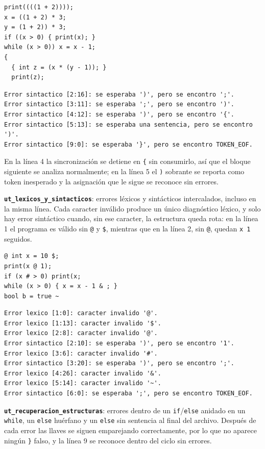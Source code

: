 \documentclass[12pt,letterpaper]{article}
\begin{document}
\begin{verbatim}
print((((1 + 2))));
x = ((1 + 2) * 3;
y = (1 + 2)) * 3;
if ((x > 0) { print(x); }
while (x > 0)) x = x - 1;
{
  { int z = (x * (y - 1)); }
  print(z);
\end{verbatim}

\begin{verbatim}
Error sintactico [2:16]: se esperaba ')', pero se encontro ';'.
Error sintactico [3:11]: se esperaba ';', pero se encontro ')'.
Error sintactico [4:12]: se esperaba ')', pero se encontro '{'.
Error sintactico [5:13]: se esperaba una sentencia, pero se encontro ')'.
Error sintactico [9:0]: se esperaba '}', pero se encontro TOKEN_EOF.
\end{verbatim}

En la línea 4 la sincronización se detiene en \texttt{\{} sin consumirlo, así que el bloque siguiente se
analiza normalmente; en la línea 5 el \texttt{)} sobrante se reporta como token inesperado y la asignación que
le sigue se reconoce sin errores.

\textbf{\texttt{ut\_lexicos\_y\_sintacticos}}: errores léxicos y sintácticos intercalados, incluso en la misma
línea. Cada caracter inválido produce un único diagnóstico léxico, y solo hay error sintáctico cuando, sin ese
caracter, la estructura queda rota: en la línea 1 el programa es válido sin \texttt{@} y \texttt{\$}, mientras
que en la línea 2, sin \texttt{@}, quedan \texttt{x 1} seguidos.

\begin{verbatim}
@ int x = 10 $;
print(x @ 1);
if (x # > 0) print(x;
while (x > 0) { x = x - 1 & ; }
bool b = true ~
\end{verbatim}

\begin{verbatim}
Error lexico [1:0]: caracter invalido '@'.
Error lexico [1:13]: caracter invalido '$'.
Error lexico [2:8]: caracter invalido '@'.
Error sintactico [2:10]: se esperaba ')', pero se encontro '1'.
Error lexico [3:6]: caracter invalido '#'.
Error sintactico [3:20]: se esperaba ')', pero se encontro ';'.
Error lexico [4:26]: caracter invalido '&'.
Error lexico [5:14]: caracter invalido '~'.
Error sintactico [6:0]: se esperaba ';', pero se encontro TOKEN_EOF.
\end{verbatim}

\textbf{\texttt{ut\_recuperacion\_estructuras}}: errores dentro de un \texttt{if}/\texttt{else} anidado en
un \texttt{while}, un \texttt{else} huérfano y un \texttt{else} sin sentencia al final del archivo. Después de
cada error las llaves se siguen emparejando correctamente, por lo que no aparece ningún \texttt{\}} falso, y
la línea 9 se reconoce dentro del ciclo sin errores.
\end{document}
